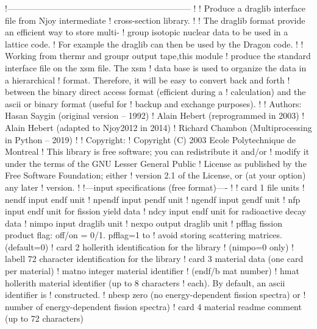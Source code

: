 \small
\begin{ccode}

   !-----------------------------------------------------------------
   !
   !     Produce a draglib interface file from Njoy intermediate
   !   cross-section library.
   !
   !     The draglib format provide an efficient way to store multi-
   !   group isotopic nuclear data to be used in a lattice code.
   !   For example the draglib can then be used by the Dragon code.
   !
   !     Working from thermr and groupr output tape,this module
   !   produce the standard interface file on the xsm file. The xsm
   !   data base is used to organize the data in a hierarchical
   !   format. Therefore, it will be easy to convert back and forth
   !   between the binary direct access format (efficient during a
   !   calculation) and the ascii or binary format (useful for
   !   backup and exchange purposes).
   !
   ! Authors: Hasan Saygin (original version -- 1992)
   !          Alain Hebert (reprogrammed in 2003)
   !          Alain Hebert (adapted to Njoy2012 in 2014)
   !          Richard Chambon (Multiprocessing in Python -- 2019)
   !
   ! Copyright:
   !  Copyright (C) 2003 Ecole Polytechnique de Montreal
   !  This library is free software; you can redistribute it and/or
   !  modify it under the terms of the GNU Lesser General Public
   !  License as published by the Free Software Foundation; either
   !  version 2.1 of the License, or (at your option) any later
   !  version.
   !
   !---input specifications (free format)----
   !
   ! card 1 file units
   !   nendf     input endf unit
   !   npendf    input pendf unit
   !   ngendf    input gendf unit
   !   nfp       input endf unit for fission yield data
   !   ndcy      input endf unit for radioactive decay data
   !   nimpo     input draglib unit
   !   nexpo     output draglib unit
   !   pfflag    fission product flag: off/on = 0/1. pfflag=1 to
   !             avoid storing scattering matrices. (default=0)
   ! card 2 hollerith identification for the library
   ! (nimpo=0 only)
   !   labell    72 character identification for the library
   ! card 3 material data (one card per material)
   !   matno     integer material identifier
   !             (endf/b mat number)
   !   hmat      hollerith material identifier (up to 8 characters
   !             each). By default, an ascii identifier is
   !             constructed.
   !   nbesp     zero (no energy-dependent fission spectra) or
   !             number of energy-dependent fission spectra)
   ! card 4 material readme comment (up to 72 characters)

\end{ccode}
